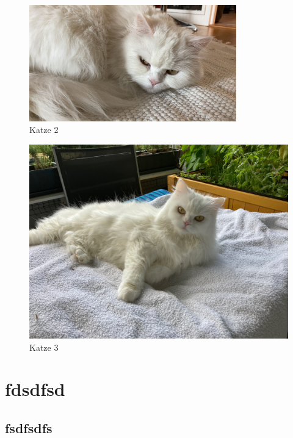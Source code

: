 \documentclass[12pt,ngerman,parskip=half]{scrreport}
\begin{document}
\blindtext[1]


\begin{figure}[h]
\begin{center}
\includegraphics[width=0.8\textwidth]{Bilder/miau}
\end{center}
\caption{Katze 2}\label{fig:miau}
\end{figure}

\blindtext[5]


\begin{figure}[b]
\begin{center}
\includegraphics[width=\textwidth]{Bilder/Katze1}
\end{center}
\caption{Katze 3}\label{fig:katze1}
\end{figure}

\blindtext[5]

\section{fdsdfsd}
\subsection{fsdfsdfs}
\end{document}
